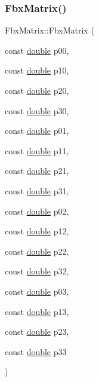 \subsubsection{\texorpdfstring{Fbx\+Matrix()}{FbxMatrix()}\hspace{0.1cm}{\footnotesize\ttfamily [6/6]}}
{\footnotesize\ttfamily Fbx\+Matrix\+::\+Fbx\+Matrix (\begin{DoxyParamCaption}\item[{const \hyperlink{class_fbx_matrix_a01f8be57393e5d9973b23897c29d5520}{double}}]{p00,  }\item[{const \hyperlink{class_fbx_matrix_a01f8be57393e5d9973b23897c29d5520}{double}}]{p10,  }\item[{const \hyperlink{class_fbx_matrix_a01f8be57393e5d9973b23897c29d5520}{double}}]{p20,  }\item[{const \hyperlink{class_fbx_matrix_a01f8be57393e5d9973b23897c29d5520}{double}}]{p30,  }\item[{const \hyperlink{class_fbx_matrix_a01f8be57393e5d9973b23897c29d5520}{double}}]{p01,  }\item[{const \hyperlink{class_fbx_matrix_a01f8be57393e5d9973b23897c29d5520}{double}}]{p11,  }\item[{const \hyperlink{class_fbx_matrix_a01f8be57393e5d9973b23897c29d5520}{double}}]{p21,  }\item[{const \hyperlink{class_fbx_matrix_a01f8be57393e5d9973b23897c29d5520}{double}}]{p31,  }\item[{const \hyperlink{class_fbx_matrix_a01f8be57393e5d9973b23897c29d5520}{double}}]{p02,  }\item[{const \hyperlink{class_fbx_matrix_a01f8be57393e5d9973b23897c29d5520}{double}}]{p12,  }\item[{const \hyperlink{class_fbx_matrix_a01f8be57393e5d9973b23897c29d5520}{double}}]{p22,  }\item[{const \hyperlink{class_fbx_matrix_a01f8be57393e5d9973b23897c29d5520}{double}}]{p32,  }\item[{const \hyperlink{class_fbx_matrix_a01f8be57393e5d9973b23897c29d5520}{double}}]{p03,  }\item[{const \hyperlink{class_fbx_matrix_a01f8be57393e5d9973b23897c29d5520}{double}}]{p13,  }\item[{const \hyperlink{class_fbx_matrix_a01f8be57393e5d9973b23897c29d5520}{double}}]{p23,  }\item[{const \hyperlink{class_fbx_matrix_a01f8be57393e5d9973b23897c29d5520}{double}}]{p33 }\end{DoxyParamCaption})}

